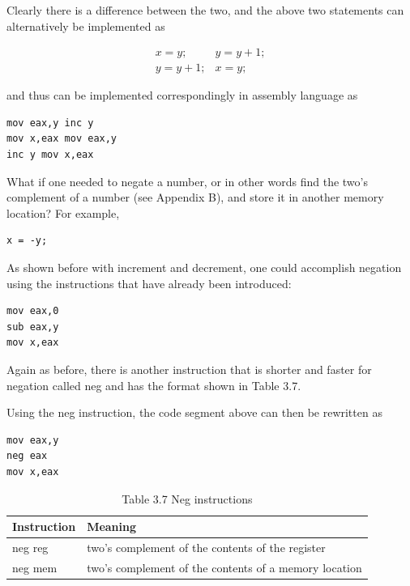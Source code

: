\documentclass[10pt]{book}
\begin{document}
Clearly there is a difference between the two, and the above two statements can alternatively be implemented as

$$
\begin{array}{ll}
x=y ; & y=y+1 ; \\
y=y+1 ; & x=y ;
\end{array}
$$

and thus can be implemented correspondingly in assembly language as

\begin{verbatim}
mov eax,y inc y
mov x,eax mov eax,y
inc y mov x,eax
\end{verbatim}

What if one needed to negate a number, or in other words find the two's complement of a number (see Appendix B), and store it in another memory location? For example,

\begin{verbatim}
x = -y;
\end{verbatim}

As shown before with increment and decrement, one could accomplish negation using the instructions that have already been introduced:

\begin{verbatim}
mov eax,0
sub eax,y
mov x,eax
\end{verbatim}

Again as before, there is another instruction that is shorter and faster for negation called neg and has the format shown in Table 3.7.

Using the neg instruction, the code segment above can then be rewritten as

\begin{verbatim}
mov eax,y
neg eax
mov x,eax
\end{verbatim}

\begin{table}[htbp]
\begin{center}
\captionsetup{labelformat=empty}
\caption{Table 3.7 Neg instructions}
\begin{tabular}{|l|l|}
\hline
Instruction & Meaning \\
\hline
neg reg & two's complement of the contents of the register \\
\hline
neg mem & two's complement of the contents of a memory location \\
\hline
\end{tabular}
\end{center}
\end{table}
\end{document}
